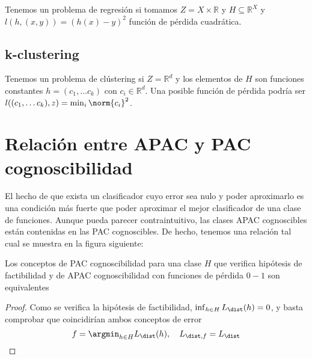 Tenemos un problema de regresión si tomamos $Z=X \times \mathbb{R}$ y $H\subseteq \mathbb{R}^X$
y $l(h,(x,y)) = (h(x)-y)^2$ función de pérdida cuadrática.

\subsection{k-clustering}

Tenemos un problema de clústering si $Z=\mathbb{R}^d$ y los elementos de $H$ son funciones constantes 
$h = (c_1, \ldots c_k)$ con $c_i \in \mathbb{R}^d$. Una posible función de pérdida podría ser 
$l((c_1, \ldots c_k), z) = \min_{i} \norm{c_i}^2$.


\section{Relación entre APAC y PAC cognoscibilidad}

El hecho de que exista un clasificador cuyo error sea nulo y poder aproximarlo es una condición más fuerte que poder 
aproximar el mejor clasificador de una clase de funciones. Aunque pueda parecer contraintuitivo, las clases APAC 
cognoscibles están contenidas en las PAC cognoscibles. De hecho, tenemos una relación tal cual se muestra en la figura
siguiente:


\begin{fact}
 Los conceptos de PAC cognoscibilidad para una clase $H$ que verifica hipótesis de factibilidad y de APAC cognoscibilidad 
 con funciones de pérdida $0-1$ son equivalentes
\end{fact}

\begin{proof}
 Como se verifica la hipótesis de factibilidad, $\inf_{h\in H} L_{\dist}(h) = 0$, y basta comprobar que coincidirían 
 ambos conceptos de error \[f = \argmin_{h\in H} L_{\dist}(h), \quad L_{\dist,f} = L_{\dist}\]
\end{proof}

